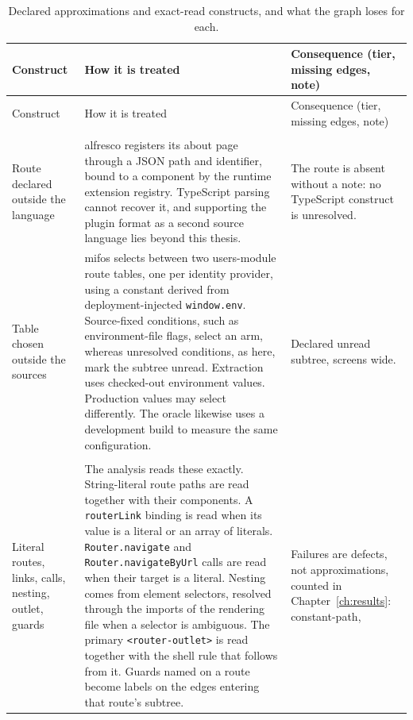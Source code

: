 \begingroup\footnotesize\setlength{\tabcolsep}{3pt}
\begin{xltabular}{\textwidth}{@{}>{\raggedright\arraybackslash}p{2.7cm}YY@{}}
\caption{Declared approximations and exact-read constructs, and what the graph loses for each.}
\label{tab:approximations}\\
\toprule
Construct & How it is treated & Consequence (tier, missing edges, note) \\
\midrule
\endfirsthead
\toprule
Construct & How it is treated & Consequence (tier, missing edges, note) \\
\midrule
\endhead
\bottomrule
\endfoot
{}\\
\addlinespace[2pt]
Route declared outside the language
& alfresco registers its about page through a JSON path and identifier, bound to a component by the
runtime extension registry. TypeScript parsing cannot recover it, and supporting the plugin format as
a second source language lies beyond this thesis.
& The route is absent without a note: no TypeScript construct is unresolved. \\
Table chosen outside the sources
& mifos selects between two users-module route tables, one per identity provider, using a constant
derived from deployment-injected \texttt{window.env}. Source-fixed conditions, such as environment-file
flags, select an arm, whereas unresolved conditions, as here, mark the subtree unread.
Extraction uses checked-out environment values. Production values may select differently.
The oracle likewise uses a development build to measure the same configuration.
& Declared unread subtree, \ProbeMissedMifos{} screens wide. \\
\addlinespace[2pt]
\\
\addlinespace[2pt]
Literal routes, links, calls, nesting, outlet, guards
& The analysis reads these exactly. String-literal route paths are read together with their components.
A \texttt{routerLink} binding is read when its value is a literal or an array of literals.
\texttt{Router.navigate} and \texttt{Router.navigateByUrl} calls are read when their target is a literal.
Nesting comes from element selectors, resolved through the imports of the rendering file when a selector is ambiguous.
The primary \texttt{<router-outlet>} is read together with the shell rule that follows from it.
Guards named on a route become labels on the edges entering that route's subtree.
& Failures are defects, not approximations, counted in Chapter~\ref{ch:results}: constant-path,

\end{xltabular}
